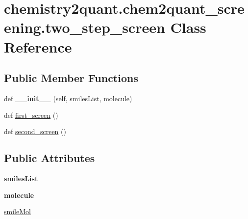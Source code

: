 \hypertarget{classchemistry2quant_1_1chem2quant__screening_1_1two__step__screen}{}\section{chemistry2quant.\+chem2quant\+\_\+screening.\+two\+\_\+step\+\_\+screen Class Reference}
\label{classchemistry2quant_1_1chem2quant__screening_1_1two__step__screen}
\subsection*{Public Member Functions}
\begin{DoxyCompactItemize}
\item
\mbox{\label{classchemistry2quant_1_1chem2quant__screening_1_1two__step__screen_a668b8e0a34e77ed7a99ebfa840f5a671}}
def {\bfseries \+\_\+\+\_\+init\+\_\+\+\_\+} (self, smiles\+List, molecule)
\item
def \hyperlink{classchemistry2quant_1_1chem2quant__screening_1_1two__step__screen_a7055bbeb08bf745c49037a705b01ed71}{first\+\_\+screen} ()
\item
def \hyperlink{classchemistry2quant_1_1chem2quant__screening_1_1two__step__screen_a06a642274b788b8c411020438f82d04f}{second\+\_\+screen} ()
\end{DoxyCompactItemize}
\subsection*{Public Attributes}
\begin{DoxyCompactItemize}
\item
\mbox{\label{classchemistry2quant_1_1chem2quant__screening_1_1two__step__screen_ac68faf6910ed2387e69bb411b58fb270}}
{\bfseries smiles\+List}
\item
\mbox{\label{classchemistry2quant_1_1chem2quant__screening_1_1two__step__screen_a95ae6f8e785064baa9a1f896c5fa7ce4}}
{\bfseries molecule}
\item
\hyperlink{classchemistry2quant_1_1chem2quant__screening_1_1two__step__screen_a6fde4c5a06a5d83ff1bad48186131072}{smile\+Mol}
\end{DoxyCompactItemize}


